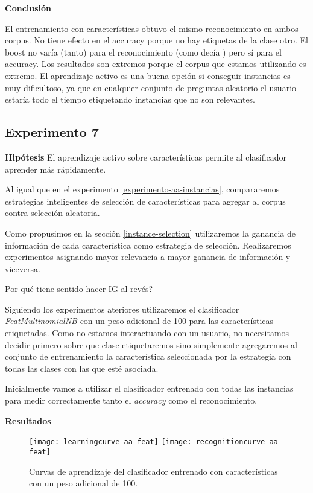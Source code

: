 \textbf{Conclusión}

El entrenamiento con características obtuvo el mismo reconocimiento en ambos corpus.
No tiene efecto en el accuracy porque no hay etiquetas de la clase otro.
El boost no varía (tanto) para el reconocimiento (como decía \citet{dualist}) pero sí para el accuracy.
Los resultados son extremos porque el corpus que estamos utilizando es extremo.
El aprendizaje activo es una buena opción si conseguir instancias es muy dificultoso, ya que en cualquier conjunto de preguntas aleatorio el usuario estaría todo el tiempo etiquetando instancias que no son relevantes.


\subsection{Experimento 7}
\vspace{3 mm}
\textbf{Hipótesis} El aprendizaje activo sobre características permite al clasificador aprender más rápidamente.
\vspace{3 mm}

Al igual que en el experimento \ref{experimento-aa-instancias}, compararemos estrategias inteligentes de selección de características para agregar al corpus contra selección aleatoria.

Como propusimos en la sección \ref{instance-selection} utilizaremos la ganancia de información de cada característica como estrategia de selección. Realizaremos experimentos asignando mayor relevancia a mayor ganancia de información y viceversa.

Por qué tiene sentido hacer IG al revés?

Siguiendo los experimentos ateriores utilizaremos el clasificador \textit{FeatMultinomialNB} con un peso adicional de 100 para las características etiquetadas. Como no estamos interactuando con un usuario, no necesitamos decidir primero sobre que clase etiquetaremos sino simplemente agregaremos al conjunto de entrenamiento la característica seleccionada por la estrategia con todas las clases con las que esté asociada.

Inicialmente vamos a utilizar el clasificador entrenado con todas las instancias para medir correctamente tanto el \textit{accuracy} como el reconocimiento.

\vspace{3 mm}

\textbf{Resultados}

\begin{figure}[h!]\label{comp-feat-selection}
\centering
\texttt{[image: learningcurve-aa-feat]}
\texttt{[image: recognitioncurve-aa-feat]}
\caption{Curvas de aprendizaje del clasificador entrenado con características con un peso adicional de 100.}
\end{figure}
\vspace{3 mm}

